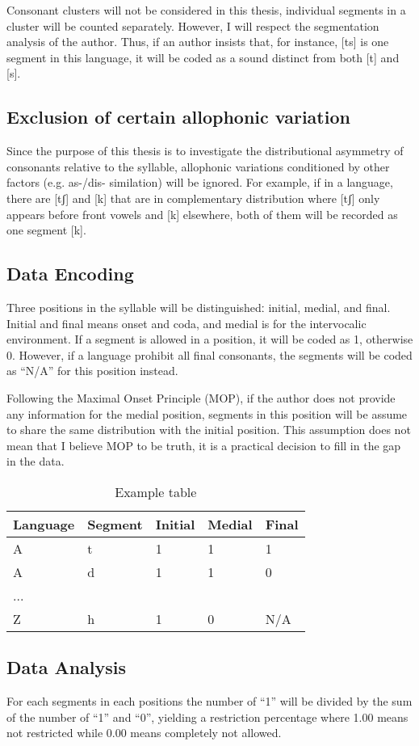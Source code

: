 Consonant clusters will not be considered in this thesis, individual segments in a cluster will be counted separately. However, I will respect the segmentation analysis of the author. Thus, if an author insists that, for instance, [ts] is one segment in this language, it will be coded as a sound distinct from both [t] and [s].

\subsection{Exclusion of certain allophonic variation}

Since the purpose of this thesis is to investigate the distributional asymmetry of consonants relative to the syllable, allophonic variations conditioned by other factors (e.g. as-/dis- similation) will be ignored. For example, if in a language, there are [tʃ] and [k] that are in complementary distribution where [tʃ] only appears before front vowels and [k] elsewhere, both of them will be recorded as one segment [k]. 

\subsection{Data Encoding}

Three positions in the syllable will be distinguishedː initial, medial, and final. Initial and final means onset and coda, and medial is for the intervocalic environment. 
If a segment is allowed in a position, it will be coded as 1, otherwise 0. However, if a language prohibit all final consonants, the segments will be coded as ``N/A'' for this position instead.

\par 
Following the Maximal Onset Principle (MOP), if the author does not provide any information for the medial position, segments in this position will be assume to share the same distribution with the initial position. This assumption does not mean that I believe MOP to be truth, it is a practical decision to fill in the gap in the data.

\begin{table}[h]
    \centering
    \begin{tabular}{| l | l | l | l | l |}
    \hline
     Language & Segment & Initial & Medial & Final \\ \hline
	A & t & 1 & 1 & 1 \\ \hline
	A & d & 1 & 1 & 0 \\ \hline
	... &  &  &  &  \\ \hline
	Z & h & 1 & 0 & N/A \\ \hline
    \end{tabular}
    \caption{Example table}
    \label{tab:example}
\end{table}

\subsection{Data Analysis}

For each segments in each positions the number of ``1'' will be divided by the sum of the number of ``1'' and ``0'', yielding a restriction percentage where 1.00 means not restricted while 0.00 means completely not allowed. 


